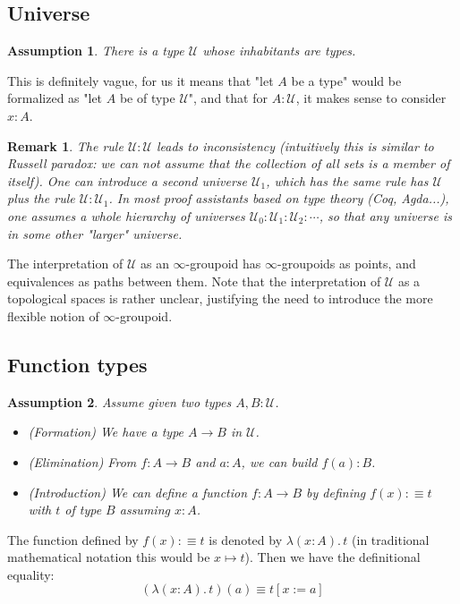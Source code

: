 \documentclass{article}
\newcommand{\sse}[1]{\medbreak \subsection{#1}}
\newcommand{\U}{{\mathcal U}}
\renewcommand{\r}{\rightarrow}
\newcommand{\Gl}{\lambda}
\newtheorem{remark}{Remark}
\newtheorem{assumption}{Assumption}
\begin{document}
\sse{Universe}

\begin{assumption}
There is a type $\U$ whose inhabitants are types.
\end{assumption}

This is definitely vague, for us it means that "let $A$ be a type" would be formalized as "let $A$ be of type $\U$", and that for $A:\U$, it makes sense to consider $x:A$.

\begin{remark}
The rule $\U:\U$ leads to inconsistency (intuitively this is similar to Russell paradox: we can not assume that the collection of all sets is a member of itself). One can introduce a second universe $\U_1$, which has the same rule has $\U$ plus the rule $\U:\U_1$. In most proof assistants based on type theory (Coq, Agda...), one assumes a whole hierarchy of universes $\U_0:\U_1:\U_2:\cdots$, so that any universe is in some other "larger" universe.
\end{remark}


The interpretation of $\U$ as an $\infty$-groupoid has $\infty$-groupoids as points, and equivalences as paths between them. Note that the interpretation of $\U$ as a topological spaces is rather unclear, justifying the need to introduce the more flexible notion of $\infty$-groupoid.



\sse{Function types}

\begin{assumption}
Assume given two types $A,B:\U$.
\begin{itemize}
\item (Formation) We have a type $A\r B$ in $\U$.
\item (Elimination) From $f:A\r B$ and $a:A$, we can build $f(a):B$.
\item (Introduction) We can define a function $f:A\r B$ by defining $f(x):\equiv t$ with $t$ of type $B$ assuming $x:A$.
\end{itemize}
\end{assumption}

The function defined by $f(x):\equiv t$ is denoted by $\Gl (x:A).\, t$ (in traditional mathematical notation this would be $x\mapsto t$). Then we have the definitional equality:
\[(\Gl (x:A).\, t)(a) \equiv t[x:=a]\]
\end{document}
